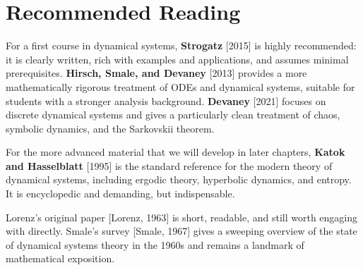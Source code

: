 \section*{Recommended Reading}

For a first course in dynamical systems, \textbf{Strogatz} [2015] is highly recommended: it is clearly written, rich with examples and applications, and assumes minimal prerequisites. \textbf{Hirsch, Smale, and Devaney} [2013] provides a more mathematically rigorous treatment of ODEs and dynamical systems, suitable for students with a stronger analysis background. \textbf{Devaney} [2021] focuses on discrete dynamical systems and gives a particularly clean treatment of chaos, symbolic dynamics, and the Sarkovskii theorem.

For the more advanced material that we will develop in later chapters, \textbf{Katok and Hasselblatt} [1995] is the standard reference for the modern theory of dynamical systems, including ergodic theory, hyperbolic dynamics, and entropy. It is encyclopedic and demanding, but indispensable.

Lorenz's original paper [Lorenz, 1963] is short, readable, and still worth engaging with directly. Smale's survey [Smale, 1967] gives a sweeping overview of the state of dynamical systems theory in the 1960s and remains a landmark of mathematical exposition.
